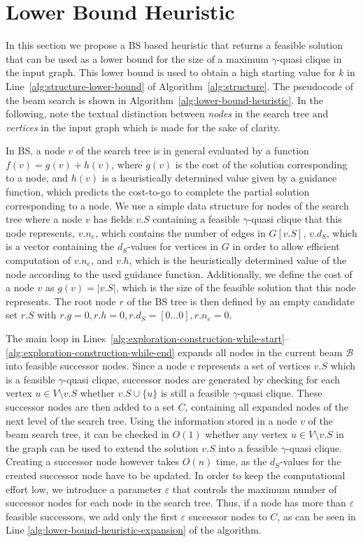 \documentclass[draft,final]{vutinfth} %
\begin{document}
\section{Lower Bound Heuristic}\label{sec:lower-bound-heuristic}

In this section we propose a BS based heuristic that returns a feasible solution that can be used as a lower bound for the size of a maximum $\gamma$-quasi clique in the input graph. This lower bound is used to obtain a high starting value for $k$ in Line~\ref{alg:structure-lower-bound} of Algorithm~\ref{alg:structure}. 
The pseudocode of the beam search is shown in Algorithm~\ref{alg:lower-bound-heuristic}. 
In the following, note the textual distinction between \emph{nodes} in the search tree and \emph{vertices} in the input graph which is made for the sake of clarity. 

In BS, a node $v$ of the search tree is in general evaluated by a function $f(v) = g(v) + h(v)$, where $g(v)$ is the cost of the solution corresponding to a node, and $h(v)$ is a heuristically determined value given by a guidance function, which predicts the cost-to-go to complete the partial solution corresponding to a node. 
We use a simple data structure for nodes of the search tree where a node $v$ has fields $v.S$ containing a feasible $\gamma$-quasi clique that this node represents, $v.n_e$, which contains the number of edges in $G[v.S]$, $v.d_S$, which is a vector containing the $d_S$-values for vertices in $G$ in order to allow efficient computation of $v.n_e$, and $v.h$, which is the heuristically determined value of the node according to the used guidance function.
Additionally, we define the cost of a node $v$ as $g(v) = |v.S|$, which is the size of the feasible solution that this node represents.  
The root node $r$ of the BS tree is then defined by an empty candidate set $r.S$ with $r.g=0, r.h=0, r.d_S = [0 \dots 0], r.n_e = 0$. 

The main loop in Lines~\ref{alg:exploration-construction-while-start}--\ref{alg:exploration-construction-while-end} expands all nodes in the current beam $\mathcal{B}$ into feasible successor nodes. 
Since a node $v$ represents a set of vertices $v.S$ which is a feasible $\gamma$-quasi clique, successor nodes are generated by checking for each vertex $u \in V \setminus v.S$ whether $v.S \cup \{u\}$ is still a feasible $\gamma$-quasi clique. These successor nodes are then added to a set $C$, containing all expanded nodes of the next level of the search tree. 
Using the information stored in a node $v$ of the beam search tree, it can be checked in $O(1)$ whether any vertex $u \in V \setminus v.S$ in the graph can be used to extend the solution $v.S$ into a feasible $\gamma$-quasi clique. Creating a successor node however takes $O(n)$ time, as the $d_S$-values for the created successor node have to be updated. 
In order to keep the computational effort low, we introduce a parameter $\varepsilon$ that controls the maximum number of successor nodes for each node in the search tree. Thus, if a node has more than $\varepsilon$ feasible successors, we add only the first $\varepsilon$ successor nodes to $C$, as can be seen in Line \ref{alg:lower-bound-heuristic-expansion} of the algorithm. 
\end{document}
